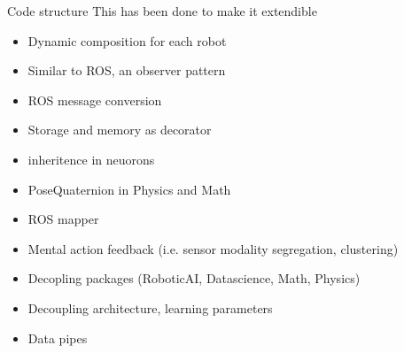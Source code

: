 \begin{frame}[allowframebreaks]{Code structure}
    This has been done to make it extendible
    \begin{itemize}
        \item Dynamic composition for each robot
        \item Similar to ROS, an observer pattern
        \item ROS message conversion
        \item Storage and memory as decorator
        \item inheritence in neuorons
        \item PoseQuaternion in Physics and Math
        \item ROS mapper
        \item Mental action feedback (i.e. sensor modality segregation, clustering)
        \item Decopling packages (RoboticAI, Datascience, Math, Physics)
        \item Decoupling architecture,  learning parameters
        \item Data pipes

    \end{itemize}
\end{frame}